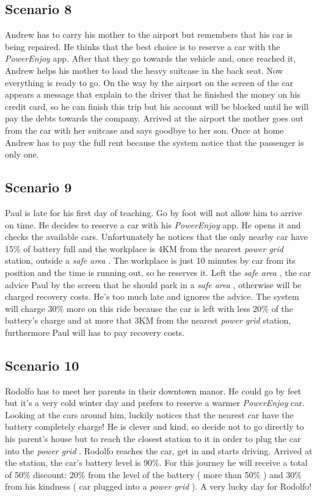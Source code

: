 \documentclass[english]{article}
\newcommand{\powerenjoy}{\textit{PowerEnjoy }}
\newcommand{\safearea}{\textit{safe area }}
\newcommand{\powergrid}{\textit{power grid }}
\begin{document}
	\subsection{Scenario 8}
		Andrew has to carry his mother to the airport but remembers that his car is being repaired. He thinks that the best choice is to reserve a car with the \powerenjoy app. After that they go towards the vehicle and, once reached it, Andrew helps his mother to load the heavy suitcase in the back seat. Now everything is ready to go. On the way by the airport on the screen of the car appears a message that explain to the driver that he finished the money on his credit card, so he can finish this trip but his account will be blocked until he will pay the debts towards the company. Arrived at the airport the mother goes out from the car with her suitcase and says goodbye to her son. Once at home Andrew has to pay the full rent because the system notice that the passenger is only one.
	\subsection{Scenario 9}
		Paul is late for his first day of teaching. Go by foot will not allow him to arrive on time. He decides to reserve a car with his \powerenjoy app. He opens it and checks the available cars. Unfortunately he notices that the only nearby car have 15\% of battery full and the workplace is 4KM from the nearest \powergrid station, outside a \safearea. The workplace is just 10 minutes by car from its position and the time is running out, so 	he reserves it. Left the \safearea, the car advice Paul by the screen that he should 	park in a \safearea, otherwise will be charged recovery costs. He's too much late and ignores the advice. The system will charge 30\% more on this ride because the car is left with less 20\% of the battery's charge and at more that 3KM from the nearest \powergrid station, furthermore Paul will has to pay recovery costs.
	\subsection{Scenario 10}
		Rodolfo has to meet her parents in their downtown manor. He could go by feet but it's a very cold winter day and prefers to reserve a warmer \powerenjoy car. Looking at the cars around him, luckily notices that the nearest car have the battery completely charge! He is clever and kind, so decide not to go directly to his parent's house but to reach the closest station to it in order to plug the car into the \powergrid. Rodolfo reaches the car, get in and starts driving. Arrived at the station, the car's battery level is 90\%. For this journey he will receive a total of 50\% discount: 20\% from the level of the battery ( more than 50\% ) and 30\% from his kindness ( car plugged into a \powergrid ). A very lucky day for Rodolfo!
\end{document}

